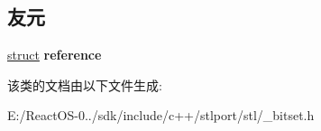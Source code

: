 \subsection*{友元}
\begin{DoxyCompactItemize}
\item 
\mbox{\label{classbitset_a90e22001176b08282c8c6c61b1e7089d}} 
\hyperlink{interfacestruct}{struct} {\bfseries reference}
\end{DoxyCompactItemize}


该类的文档由以下文件生成\+:\begin{DoxyCompactItemize}
\item 
E\+:/\+React\+O\+S-\/0../sdk/include/c++/stlport/stl/\+\_\+bitset.\+h\end{DoxyCompactItemize}
